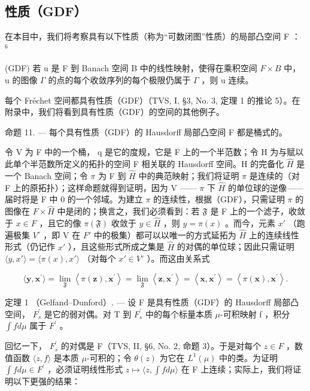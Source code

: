 \subsection{性质（GDF）}

在本目中，我们将考察具有以下性质（称为“可数闭图”性质）的局部凸空间 F ： \(^{6}\)

(GDF) 若 u 是 F 到 Banach 空间 B 中的线性映射，使得在乘积空间 \(F \times B\) 中， u 的图像 \(\Gamma\) 的点的每个收敛序列的每个极限仍属于 \(\Gamma\) ，则 u 连续。

每个 Fréchet 空间都具有性质（GDF）（TVS, I, §3, No. 3, 定理 1 的推论 5）。在附录中，我们将看到具有性质（GDF）的空间的其他例子。

命题 11. --- 每个具有性质（GDF）的 Hausdorff 局部凸空间 F 都是桶式的。

令 V 为 F 中的一个桶， q 是它的度规，它是 F 上的一个半范数；令 H 为与赋以此单个半范数所定义的拓扑的空间 F 相关联的 Hausdorff 空间。H 的完备化 \(\hat{H}\) 是一个 Banach 空间；令 \(\pi\) 为 F 到 \(\hat{H}\) 中的典范映射；我们将证明 \(\pi\) 是连续的（对 F 上的原拓扑）；这样命题就得到证明，因为 V —— \(\pi\) 下 \(\hat{H}\) 的单位球的逆像——届时将是 F 中 0 的一个邻域。为建立 \(\pi\) 的连续性，根据（GDF），只需证明 \(\pi\) 的图像在 \(F \times \hat{H}\) 中是闭的；换言之，我们必须看到：若 \(\mathfrak{F}\) 是 F 上的一个滤子，收敛于 \(x \in F\) ，且它的像 \(\pi(\mathfrak{F})\) 收敛于 \(y \in \hat{H}\) ，则 \(y = \pi(x)\) 。而今，元素 \(x'\) （跑遍极集 \(V^{\circ}\) ，即 V 在 \(F'\) 中的极集）都可以以唯一的方式延拓为 \(\hat{H}\) 上的连续线性形式（仍记作 \(x'\) ），且这些形式所成之集是 \(\hat{H}\) 的对偶的单位球；因此只需证明 \(\langle y, x' \rangle = \langle \pi(x), x' \rangle\) （对每个 \(x' \in V^{\circ}\) ）。而这由关系式

\[
\langle \mathbf {y}, \mathbf {x} ^ {\prime} \rangle = \lim _ {\mathfrak {F}} \left\langle \pi (\mathbf {z}), \mathbf {x} ^ {\prime} \right\rangle = \lim _ {\mathfrak {F}} \left\langle \mathbf {z}, \mathbf {x} ^ {\prime} \right\rangle = \left\langle \mathbf {x}, \mathbf {x} ^ {\prime} \right\rangle = \left\langle \pi (\mathbf {x}), \mathbf {x} ^ {\prime} \right\rangle .
\]

定理 1 （Gelfand--Dunford）. --- 设 F 是具有性质（GDF）的 Hausdorff 局部凸空间， \(F_{s}^{\prime}\) 是它的弱对偶。对 T 到 \(F_{s}^{\prime}\) 中的每个标量本质 \(\mu\)-可积映射 f ，积分 \(\int f d\mu\) 属于 \(F^{\prime}\) 。

回忆一下， \(F_{s}^{\prime}\) 的对偶是 F（TVS, II, §6, No. 2, 命题 3）。于是对每个 \(z \in F\) ，数值函数 \(\langle z, f \rangle\) 是本质 \(\mu\)-可积的；令 \(\theta(z)\) 为它在 \(L^{1}(\mu)\) 中的类。为证明 \(\int f d\mu \in F^{\prime}\) ，必须证明线性形式 \(z \mapsto \langle z, \int f d\mu \rangle\) 在 F 上连续；实际上，我们将证明以下更强的结果：

